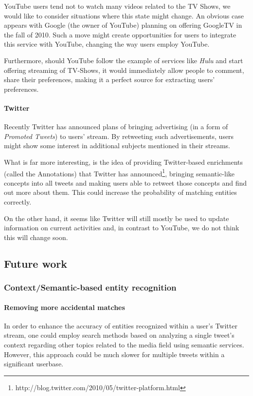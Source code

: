 YouTube users tend not to watch many videos related to the TV Shows, we would
like to consider situations where this state might change. An obvious case
appears with Google (the owner of YouTube) planning on offering GoogleTV in the
fall of 2010. Such a move might create opportunities for users to integrate
this service with YouTube, changing the way users employ YouTube.

Furthermore, should YouTube follow the example of services like \textit{Hulu}
and start offering streaming of TV-Shows, it would immediately allow people to
comment, share their preferences, making it a perfect source for extracting
users' preferences.

\paragraph{Twitter}

Recently Twitter has announced plans of bringing advertising (\eg in a form of
\textit{Promoted Tweets}) to users' stream.  By retweeting such advertisements,
users might show some interest in additional subjects mentioned in their
streams.

What is far more interesting, is the idea of providing Twitter-based
enrichments (called the Annotations) that Twitter has announced\footnote{http://blog.twitter.com/2010/05/twitter-platform.html},
bringing semantic-like concepts into all tweets and making users able to
retweet those concepts and find out more about them. This could increase
the probability of matching entities correctly.

On the other hand, it seems like Twitter will still mostly be used to update
information on current activities and, in contrast to YouTube, we do not think
this will change soon.

\subsection{Future work}

\subsubsection{Context/Semantic-based entity recognition}

\paragraph{Removing more accidental matches}

In order to enhance the accuracy of entities recognized within a user's Twitter
stream, one could employ search methods based on analyzing a single tweet's
context regarding other topics related to the media field using semantic
services.  However, this approach could be much slower for multiple tweets
within a significant userbase.

